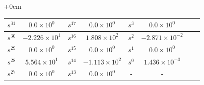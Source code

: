 \documentclass{article}
\begin{document}
\begin{table}[H]
\begin{adjustwidth}{+0cm}{}
\begin{tabular}{|c|c|c|c|c|c|c|c|}
\hline
$s^{ 31 }$ & $ 0.0 \times 10^{ 0 }$ & $s^{ 17 }$ & $ 0.0 \times 10^{ 0 }$ & $s^{ 3 }$ & $ 0.0 \times 10^{ 0 }$  \\
\hline
$s^{ 30 }$ & $ -2.226 \times 10^{ 1 }$ & $s^{ 16 }$ & $ 1.808 \times 10^{ 2 }$ & $s^{ 2 }$ & $ -2.871 \times 10^{ -2 }$  \\
\hline
$s^{ 29 }$ & $ 0.0 \times 10^{ 0 }$ & $s^{ 15 }$ & $ 0.0 \times 10^{ 0 }$ & $s^{ 1 }$ & $ 0.0 \times 10^{ 0 }$  \\
\hline
$s^{ 28 }$ & $ 5.564 \times 10^{ 1 }$ & $s^{ 14 }$ & $ -1.113 \times 10^{ 2 }$ & $s^{ 0 }$ & $ 1.436 \times 10^{ -3 }$  \\
\hline
$s^{ 27 }$ & $ 0.0 \times 10^{ 0 }$ & $s^{ 13 }$ & $ 0.0 \times 10^{ 0 }$ & - & -  \\
\hline
  	\end{tabular}
	\end{adjustwidth}
\end{table}
\end{document}
